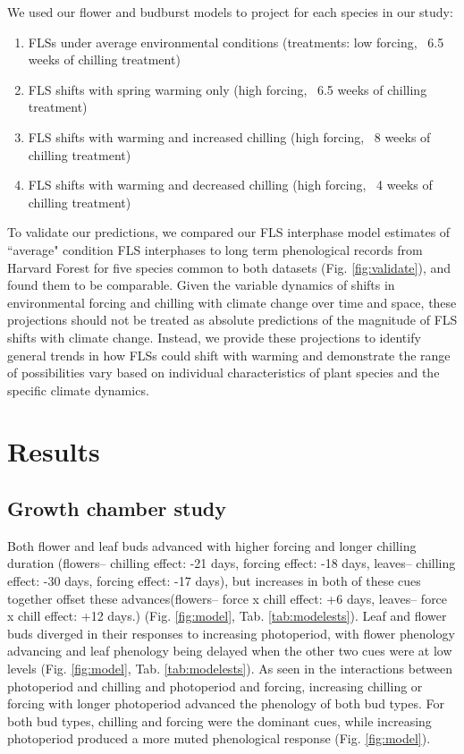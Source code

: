 \documentclass[11pt]{article}
\begin{document}
\noindent We used our flower and budburst models to project for each species in our study:\\
\begin{enumerate}
\item FLSs under average environmental conditions  (treatments: low forcing, ~6.5 weeks of chilling treatment)
\item FLS shifts with spring warming only (high forcing, ~6.5 weeks of chilling treatment)
\item FLS shifts with warming and increased chilling (high forcing, ~8 weeks of chilling treatment)
\item FLS shifts with warming and decreased chilling (high forcing, ~4 weeks of chilling treatment)

\end{enumerate}

\noindent To validate our predictions, we compared our FLS interphase model estimates of ``average" condition FLS interphases to long term phenological records from Harvard Forest \citep{OKeefe2015} for five species common to both datasets (Fig. \ref{fig:validate}), and found them to be comparable. Given the variable dynamics of shifts in environmental forcing and chilling with climate change over time and space, these projections should not be treated as absolute predictions of the magnitude of FLS shifts with climate change. Instead, we provide these projections to identify general trends in how FLSs could shift with warming and demonstrate the range of possibilities vary based on individual characteristics of plant species and the specific climate dynamics.\\

\section*{Results} %
\subsection*{Growth chamber study} %
\noindent  Both flower and leaf buds advanced with higher forcing and longer chilling duration (flowers-- chilling effect: -21 days, forcing effect: -18 days, leaves-- chilling effect: -30 days, forcing effect: -17 days), but increases in both of these cues together offset these advances(flowers-- force x chill effect: +6 days, leaves-- force x chill effect: +12 days.) (Fig. \ref{fig:model}, Tab. \ref{tab:modelests}). Leaf and flower buds diverged in their responses to increasing photoperiod, with flower phenology advancing and leaf phenology being delayed when the other two cues were at low levels (Fig. \ref{fig:model}, Tab. \ref{tab:modelests}). As seen in the interactions between photoperiod and chilling and photoperiod and forcing, increasing chilling or forcing with longer photoperiod advanced the phenology of both bud types. For both bud types, chilling and forcing were the dominant cues, while increasing photoperiod produced a more muted phenological response (Fig. \ref{fig:model}). \\
\end{document}
